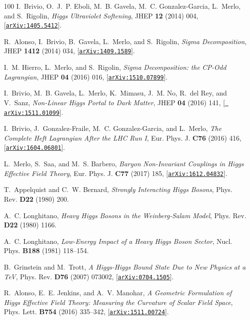 \documentclass[11pt]{article}
\renewcommand{\[}{\begin{equation}}
\renewcommand{\]}{\end{equation}}
\begin{document}
\begin{thebibliography}{100}
I.~Brivio, O.~J.~P. Eboli, M.~B. Gavela, M.~C. Gonzalez-Garcia, L.~Merlo, and
  S.~Rigolin, {\it {Higgs Ultraviolet Softening}},  JHEP {\bf 12} (2014) 004,
  [\href{http://xxx.lanl.gov/abs/1405.5412}{{\tt arXiv:1405.5412}}].

R.~Alonso, I.~Brivio, B.~Gavela, L.~Merlo, and S.~Rigolin, {\it {Sigma
  Decomposition}},  JHEP {\bf 1412} (2014) 034,
  [\href{http://xxx.lanl.gov/abs/1409.1589}{{\tt arXiv:1409.1589}}].

I.~M. Hierro, L.~Merlo, and S.~Rigolin, {\it {Sigma Decomposition: the CP-Odd
  Lagrangian}},  JHEP {\bf 04} (2016) 016,
  [\href{http://xxx.lanl.gov/abs/1510.07899}{{\tt arXiv:1510.07899}}].

I.~Brivio, M.~B. Gavela, L.~Merlo, K.~Mimasu, J.~M. No, R.~del Rey, and
  V.~Sanz, {\it {Non-Linear Higgs Portal to Dark Matter}},  JHEP {\bf 04}
  (2016) 141, [\href{http://xxx.lanl.gov/abs/1511.01099}{{\tt
  arXiv:1511.01099}}].

I.~Brivio, J.~Gonzalez-Fraile, M.~C. Gonzalez-Garcia, and L.~Merlo, {\it {The
  Complete Heft Lagrangian After the LHC Run I}}, Eur. Phys. J. {\bf C76} (2016) 416,
  [\href{http://xxx.lanl.gov/abs/1604.06801}{{\tt arXiv:1604.06801}}].

L.~Merlo, S.~Saa, and M.~S. Barbero, {\it {Baryon Non-Invariant Couplings in
  Higgs Effective Field Theory}}, Eur. Phys. J. {\bf C77} (2017) 185,
  [\href{http://xxx.lanl.gov/abs/1612.04832}{{\tt arXiv:1612.04832}}].
  
T.~Appelquist and C.~W. Bernard, {\it {Strongly Interacting Higgs Bosons}},
  Phys. Rev. {\bf D22} (1980) 200.

A.~C. Longhitano, {\it {Heavy Higgs Bosons in the Weinberg-Salam Model}},
  Phys. Rev. {\bf D22} (1980) 1166.

A.~C. Longhitano, {\it {Low-Energy Impact of a Heavy Higgs Boson Sector}},
  Nucl. Phys. {\bf B188} (1981) 118--154.

B.~Grinstein and M.~Trott, {\it {A Higgs-Higgs Bound State Due to New Physics
  at a TeV}},  Phys. Rev. {\bf D76} (2007) 073002,
  [\href{http://xxx.lanl.gov/abs/0704.1505}{{\tt arXiv:0704.1505}}].

R.~Alonso, E.~E. Jenkins, and A.~V. Manohar, {\it {A Geometric Formulation of
  Higgs Effective Field Theory: Measuring the Curvature of Scalar Field
  Space}},  Phys. Lett. {\bf B754} (2016) 335--342,
  [\href{http://xxx.lanl.gov/abs/1511.00724}{{\tt arXiv:1511.00724}}].


\end{thebibliography}
\end{document}
